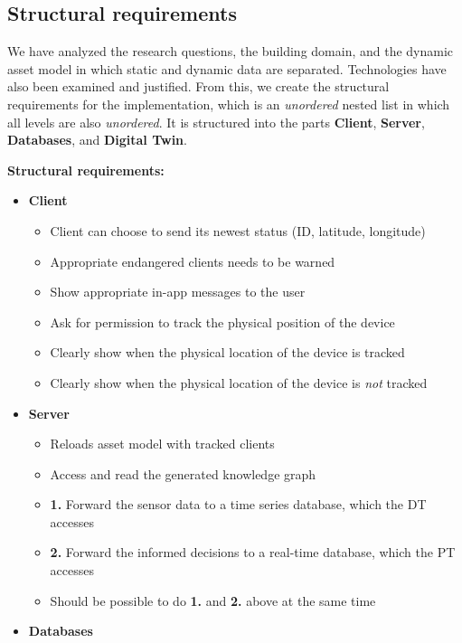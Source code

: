 \documentclass{article}
\begin{document}
\subsection{Structural requirements}\label{subsec:Requirements}
We have analyzed the research questions, the building domain, and the dynamic asset model in which static and dynamic data are separated. Technologies have also been examined and justified. From this, we create the structural requirements for the implementation, which is an \emph{unordered} nested list in which all levels are also \emph{unordered}. It is structured into the parts \textbf{Client}, \textbf{Server}, \textbf{Databases}, and \textbf{Digital Twin}.
\newline

\noindent\textbf{Structural requirements:}
\begin{itemize}
    \item \textbf{Client}
    \begin{itemize}
        \item Client can choose to send its newest status (ID, latitude, longitude) 
        \item Appropriate endangered clients needs to be warned 
        \item Show appropriate in-app messages to the user
        \item Ask for permission to track the physical position of the device
        \item Clearly show when the physical location of the device is tracked
        \item Clearly show when the physical location of the device is \emph{not} tracked
    \end{itemize}
    \item \textbf{Server}
    \begin{itemize}
        \item Reloads asset model with tracked clients
        \item Access and read the generated knowledge graph
        \item \textbf{1.} Forward the sensor data to a time series database, which the DT accesses
        \item \textbf{2.} Forward the informed decisions to a real-time database, which the PT accesses
        \item Should be possible to do \textbf{1.} and \textbf{2.} above at the same time
    \end{itemize}
    \item \textbf{Databases}

\end{itemize}
\end{document}
